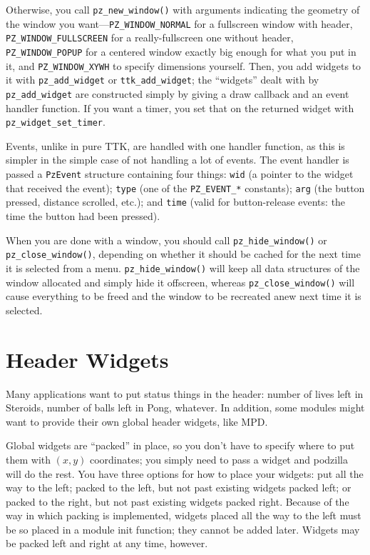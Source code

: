 \documentclass[12pt,letterpaper]{report}
\begin{document}
Otherwise, you call \verb|pz_new_window()| with arguments indicating the geometry of the
window you want---\verb|PZ_WINDOW_NORMAL| for a fullscreen window with header,
\verb|PZ_WINDOW_FULLSCREEN| for a really-fullscreen one without header, \verb|PZ_WINDOW_POPUP|
for a centered window exactly big enough for what you put in it, and \verb|PZ_WINDOW_XYWH|
to specify dimensions yourself. Then, you add widgets to it with \verb|pz_add_widget| or
\verb|ttk_add_widget|; the ``widgets'' dealt with by \verb|pz_add_widget| are constructed
simply by giving a draw callback and an event handler function. If you want a timer,
you set that on the returned widget with \verb|pz_widget_set_timer|.

Events, unlike in pure TTK, are handled with one handler function, as this is simpler in
the simple case of not handling a lot of events. The event handler is passed a \verb|PzEvent|
structure containing four things: \verb|wid| (a pointer to the widget that received the event);
\verb|type| (one of the \verb|PZ_EVENT_*| constants); \verb|arg| (the button pressed, distance
scrolled, etc.); and \verb|time| (valid for button-release events: the time the button had been
pressed).

When you are done with a window, you should call \verb|pz_hide_window()| or \verb|pz_close_window()|,
depending on whether it should be cached for the next time it is selected from a menu.
\verb|pz_hide_window()| will keep all data structures of the window allocated and simply hide
it offscreen, whereas \verb|pz_close_window()| will cause everything to be freed and the window
to be recreated anew next time it is selected.

\section{Header Widgets}
Many applications want to put status things in the header: number of lives left in Steroids,
number of balls left in Pong, whatever. In addition, some modules might want to provide their
own global header widgets, like MPD.

Global widgets are ``packed'' in place, so you don't have to specify where to put them with $(x,y)$
coordinates; you simply need to pass a widget and podzilla will do the rest. You have three
options for how to place your widgets: put all the way to the left; packed to the left, but not past
existing widgets packed left; or packed to the right, but not past existing widgets packed right.
Because of the way in which packing is implemented, widgets placed all the way to the left
must be so placed in a module init function; they cannot be added later. Widgets may be
packed left and right at any time, however.
\end{document}
